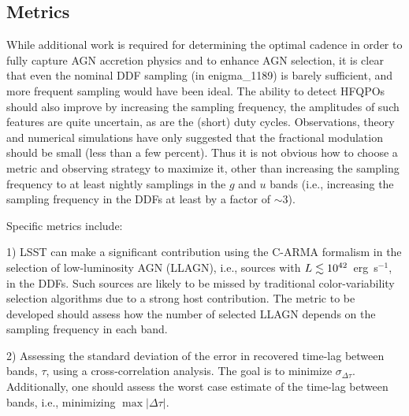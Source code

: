 
\subsection{Metrics}
\label{sec:\secname:metrics}





While additional work is required for determining the optimal cadence in order
to fully capture AGN accretion physics and to enhance AGN selection, it is clear
that even the nominal DDF sampling (in enigma\_1189) is barely sufficient, and
more frequent sampling would have been ideal. The ability to detect HFQPOs
should also improve by increasing the sampling frequency, the amplitudes of such
features are quite uncertain, as are the (short) duty cycles. Observations,
theory and numerical simulations have only suggested that the fractional
modulation should be small (less than a few percent). Thus it is not obvious how
to choose a metric and observing strategy to maximize it, other than increasing
the sampling frequency to at least nightly samplings in the $g$ and $u$ bands
(i.e., increasing the sampling frequency in the DDFs at least by a factor of
$\sim 3$).

Specific metrics include:

1) LSST can make a significant contribution using
the C-ARMA formalism in the selection of low-luminosity AGN (LLAGN), i.e.,
sources with $L \lesssim 10^{42}$~erg~s$^{-1}$, in the DDFs. Such sources are
likely to be missed by traditional color-variability selection algorithms due to
a strong host contribution. The metric to be developed should assess how the
number of selected LLAGN depends on the sampling frequency in each band.

2) Assessing the standard deviation of the error in recovered time-lag between
bands, $\tau$, using a cross-correlation analysis. The goal is to minimize
$\sigma_{\Delta \tau}$. Additionally, one should assess the worst case estimate of
the time-lag between bands, i.e., minimizing $\max \vert \Delta \tau \vert$.

